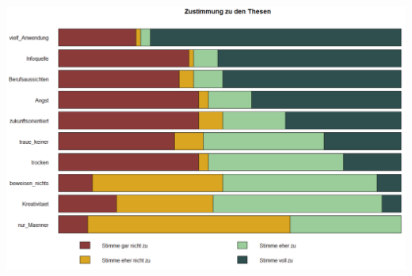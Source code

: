 \documentclass[12pt,a4paper,titlepage=true,parskip,ngerman]{scrartcl}
\begin{document}
\includegraphics[scale=0.5]{gestapelter_Barplot_Thesen}
\vspace{0.2cm}
\end{document}
